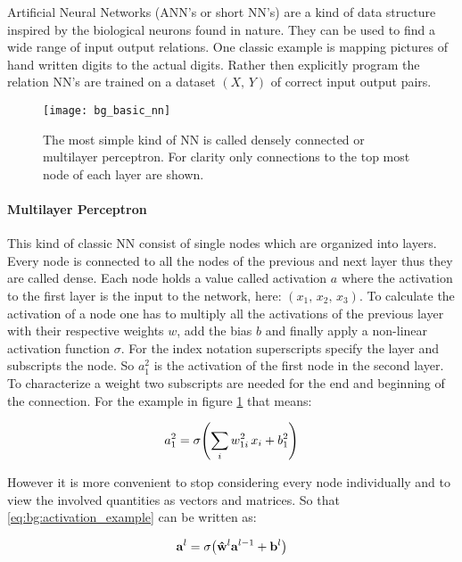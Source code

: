 Artificial Neural Networks (ANN's or short NN's) are a kind of data structure inspired by the biological neurons found in nature. They can be used to find a wide range of input output relations. One classic example is mapping pictures of hand written digits to the actual digits. Rather then explicitly program the relation NN's are trained on a dataset $(X, \, Y)$ of correct input output pairs.
\\


\begin{figure}[H]
    \centering
    \texttt{[image: bg\_basic\_nn]}
    \caption{The most simple kind of NN is called densely connected or multilayer perceptron. For clarity only connections to the top most node of each layer are shown.}
    \label{fig:bg:basic_nn}
\end{figure}

\paragraph{Multilayer Perceptron}
This kind of classic NN consist of single nodes which are organized into layers. Every node is connected to all the nodes of the previous and next layer thus they are called dense. Each node holds a value called activation $a$ where the activation to the first layer is the input to the network, here:
$(x_1, \, x_2, \, x_3)$.
To calculate the activation of a node one has to multiply all the activations of the previous layer with their respective weights $w$, add the bias $b$ and finally apply a non-linear activation function $\sigma$. For the index notation superscripts specify the layer and subscripts the node. So $a^2_1$ is the activation of the first node in the second layer. To characterize a weight two subscripts are needed for the end and beginning of the connection. For the example in figure \ref{fig:bg:basic_nn} that means:

\begin{equation} \label{eq:bg:activation_example}
    a^2_1 = \sigma \qty(\sum_i w^2_{1i} \, x_i + b^2_1)
\end{equation}

\noindent
However it is more convenient to stop considering every node individually and to view the involved quantities as vectors and matrices. So that \eqref{eq:bg:activation_example} can be written as:

\begin{equation} \label{eq:bg:activation}
    \vb{a}^l = \sigma \qty(\vu{w}^l \vb{a}^{l-1} + \vb{b}^l)
\end{equation}

